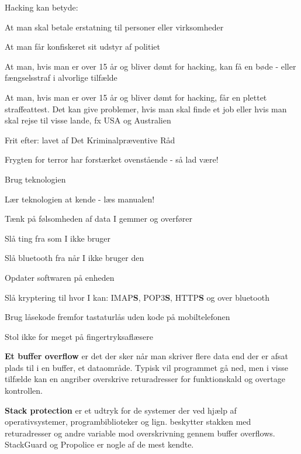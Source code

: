 \documentclass[Screen16to9,17pt]{foils}
\begin{document}
Hacking kan betyde:
\begin{list2}
\item At man skal betale erstatning til personer eller virksomheder
\item At man får konfiskeret sit udstyr af politiet
\item At man, hvis man er over 15 år og bliver dømt for hacking, kan
  få en bøde - eller fængselsstraf i alvorlige tilfælde
\item At man, hvis man er over 15 år og bliver dømt for hacking, får
en plettet straffeattest. Det kan give problemer, hvis man skal finde
et job eller hvis man skal rejse til visse lande, fx USA og
Australien
\item Frit efter:  lavet af Det
  Kriminalpræventive Råd
\item Frygten for terror har forstærket ovenstående - så lad være!
\end{list2}




\begin{list1}

\item Brug teknologien
\item Lær teknologien at kende - læs manualen!
\item Tænk på følsomheden af data I gemmer og overfører
\begin{list2}
\item Slå ting fra som I ikke bruger
\item Slå bluetooth fra når I ikke bruger den
\item Opdater softwaren på enheden
\item Slå kryptering til hvor I kan: IMAP{\bf S}, POP3{\bf S},
  HTTP{\bf S} og over bluetooth
\item Brug låsekode fremfor tastaturlås uden kode på mobiltelefonen
\item Stol ikke for meget på fingertryksaflæsere
\end{list2}
\end{list1}





\begin{list1}
\item {\bfseries Et buffer overflow}
er det der sker når man skriver flere data end der er afsat plads til
i en buffer, et dataområde. Typisk vil programmet gå ned, men i visse
tilfælde kan en angriber overskrive returadresser for funktionskald og
overtage kontrollen.
\item {\bfseries Stack protection}
er et udtryk for de systemer der ved hjælp af operativsystemer,
programbiblioteker og lign. beskytter stakken med returadresser og
andre variable mod overskrivning gennem buffer overflows. StackGuard
og Propolice er nogle af de mest kendte.
\end{list1}
\end{document}
